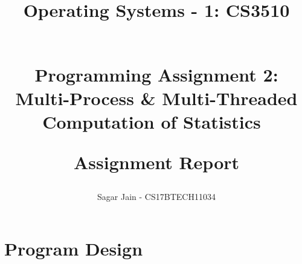 \documentclass[a4paper,12pt]{report}
\begin{document}
\title{
Operating Systems - 1: CS3510\\~\\
\begin{large}
Programming Assignment 2:\\Multi-Process \&
Multi-Threaded\\Computation of Statistics~\\
\end{large}
\begin{large}
Assignment Report
\end{large}
}
\author{Sagar Jain - CS17BTECH11034\\}
\maketitle
\section*{Program Design}
\end{document}
